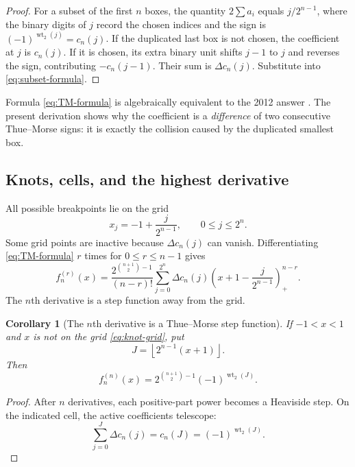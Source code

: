 \documentclass[11pt,oneside]{article}
\newtheorem{corollary}[theorem]{Corollary}
\theoremstyle{definition}
\theoremstyle{remark}
\newcommand{\wt}{\operatorname{wt}_2}
\newcommand{\pos}[1]{\left(#1\right)_{+}}
\begin{document}
\begin{proof}
For a subset of the first $n$ boxes, the quantity
$2\sum a_i$ equals $j/2^{n-1}$, where the binary digits of $j$ record the chosen indices and
the sign is $(-1)^{\wt(j)}=c_n(j)$.  If the duplicated last box is not chosen, the coefficient
at $j$ is $c_n(j)$.  If it is chosen, its extra binary unit shifts $j-1$ to $j$ and reverses
the sign, contributing $-c_n(j-1)$.  Their sum is $\Delta c_n(j)$.  Substitute into
\eqref{eq:subset-formula}.
\end{proof}

Formula \eqref{eq:TM-formula} is algebraically equivalent to the 2012 answer
\cite{mseanswer}.  The present derivation shows why the coefficient is a \emph{difference} of
two consecutive Thue--Morse signs: it is exactly the collision caused by the duplicated
smallest box.

\subsection{Knots, cells, and the highest derivative}

All possible breakpoints lie on the grid
\begin{equation}
 x_j=-1+\frac{j}{2^{n-1}},\qquad 0\le j\le2^n.             \label{eq:knot-grid}
\end{equation}
Some grid points are inactive because $\Delta c_n(j)$ can vanish.  Differentiating
\eqref{eq:TM-formula} $r$ times for $0\le r\le n-1$ gives
\begin{equation}
 f_n^{(r)}(x)=
 \frac{2^{\binom{n+1}{2}-1}}{(n-r)!}
 \sum_{j=0}^{2^n}\Delta c_n(j)
 \pos{x+1-\frac{j}{2^{n-1}}}^{n-r}.                        \label{eq:TM-derivatives}
\end{equation}
The $n$th derivative is a step function away from the grid.

\begin{corollary}[The $n$th derivative is a Thue--Morse step function]
\label{cor:nth-derivative}
If $-1<x<1$ and $x$ is not on the grid \eqref{eq:knot-grid}, put
\begin{equation}
 J=\left\lfloor2^{n-1}(x+1)\right\rfloor.
\end{equation}
Then
\begin{equation}
 f_n^{(n)}(x)=2^{\binom{n+1}{2}-1}(-1)^{\wt(J)}.            \label{eq:nth-derivative}
\end{equation}
\end{corollary}

\begin{proof}
After $n$ derivatives, each positive-part power becomes a Heaviside step.  On the indicated
cell, the active coefficients telescope:
\[
 \sum_{j=0}^{J}\Delta c_n(j)=c_n(J)=(-1)^{\wt(J)}.
\]
\end{proof}
\end{document}
